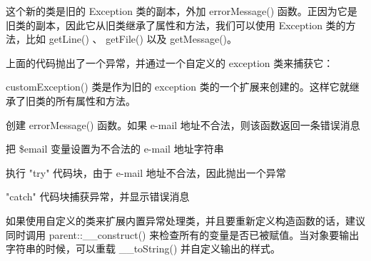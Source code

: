 这个新的类是旧的 Exception 类的副本，外加 errorMessage() 函数。正因为它是旧类的副本，因此它从旧类继承了属性和方法，我们可以使用 Exception 类的方法，比如 getLine() 、 getFile() 以及 getMessage()。

上面的代码抛出了一个异常，并通过一个自定义的 exception 类来捕获它：

\begin{compactenum}
\item customException() 类是作为旧的 exception 类的一个扩展来创建的。这样它就继承了旧类的所有属性和方法。
\item 创建 errorMessage() 函数。如果 e-mail 地址不合法，则该函数返回一条错误消息
\item 把 \$email 变量设置为不合法的 e-mail 地址字符串
\item 执行 "try" 代码块，由于 e-mail 地址不合法，因此抛出一个异常
\item "catch" 代码块捕获异常，并显示错误消息
\end{compactenum}

如果使用自定义的类来扩展内置异常处理类，并且要重新定义构造函数的话，建议同时调用 parent::\_\_construct() 来检查所有的变量是否已被赋值。当对象要输出字符串的时候，可以重载 \_\_toString() 并自定义输出的样式。

